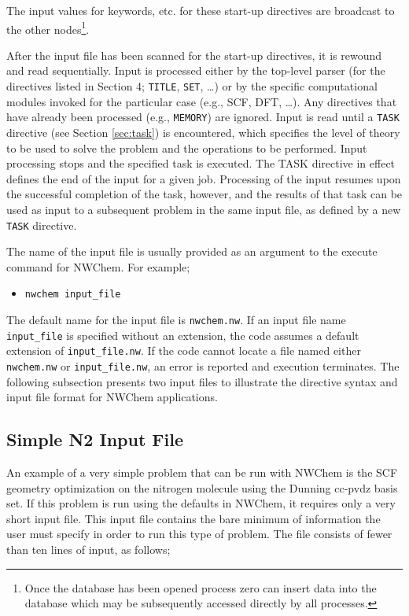 The input values for keywords, etc. for these start-up directives are
broadcast to the other nodes\footnote{Once the database has been opened
process zero can insert data into the database which may be
subsequently accessed directly by all processes.}.

After the input file has been scanned for the start-up directives, it
is rewound and read sequentially.  Input is
processed either by the top-level parser (for the directives listed in
Section 4;
\verb+TITLE+, \verb+SET+, \ldots) or by the specific computational modules
invoked for the particular case
(e.g., SCF, DFT, \ldots).  Any directives that have already been processed
(e.g., \verb+MEMORY+) are ignored.  Input is read until a \verb+TASK+
directive (see Section \ref{sec:task}) is encountered, which specifies the 
level of theory to be used to solve the problem and the operations to be 
performed.  Input processing stops and the specified task is executed.  
The TASK directive in effect defines the end of the input for a given job.  
Processing of the input resumes upon the successful completion of the task,
however, and the results of that task can be used as input to a subsequent
problem in the same input file, as defined by a new \verb+TASK+ directive.

The name of the input file is usually provided as an argument to the execute
command for NWChem.  For example;

\begin{itemize}
\item \verb+nwchem input_file+
\end{itemize}

The default name for the input file is \verb+nwchem.nw+.  If an input
file name \verb+input_file+ is specified without an extension, the code
assumes a default extension of \verb+input_file.nw+.  If the code cannot
locate a file named either \verb+nwchem.nw+ or \verb+input_file.nw+, an 
error is reported and execution terminates.  The following
subsection presents two input files to illustrate the directive syntax and 
input file format for NWChem applications.

\subsection{Simple N2 Input File}
\label{sec:simplesample}

An example of a very simple problem that can be run with NWChem is the
SCF geometry optimization on the nitrogen molecule using the Dunning 
cc-pvdz basis set.  If this problem is run using the defaults in NWChem, 
it requires only a very short input file.  This input file contains
the bare minimum of information the user must specify in order to run 
this type of problem.  The file consists of fewer than ten lines of input,
as follows;

